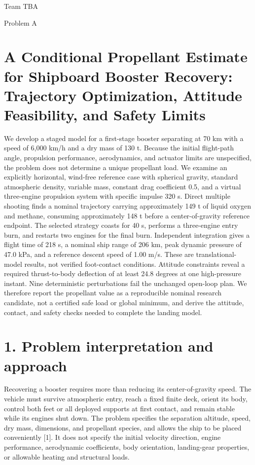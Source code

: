\documentclass[
  11pt,
  a4paper,
]{article}
\author{}
\date{}
\begin{document}
Team TBA

Problem A

\section*{A Conditional Propellant Estimate for Shipboard Booster
Recovery: Trajectory Optimization, Attitude Feasibility, and Safety
Limits}\label{a-conditional-propellant-estimate-for-shipboard-booster-recovery-trajectory-optimization-attitude-feasibility-and-safety-limits}

We develop a staged model for a first-stage booster separating at 70 km
with a speed of 6,000 km/h and a dry mass of 130 t. Because the initial
flight-path angle, propulsion performance, aerodynamics, and actuator
limits are unspecified, the problem does not determine a unique
propellant load. We examine an explicitly horizontal, wind-free
reference case with spherical gravity, standard atmospheric density,
variable mass, constant drag coefficient 0.5, and a virtual three-engine
propulsion system with specific impulse 320 s. Direct multiple shooting
finds a nominal trajectory carrying approximately 149 t of liquid oxygen
and methane, consuming approximately 148 t before a center-of-gravity
reference endpoint. The selected strategy coasts for 40 s, performs a
three-engine entry burn, and restarts two engines for the final burn.
Independent integration gives a flight time of 218 s, a nominal ship
range of 206 km, peak dynamic pressure of 47.0 kPa, and a reference
descent speed of 1.00 m/s. These are translational-model results, not
verified foot-contact conditions. Attitude constraints reveal a required
thrust-to-body deflection of at least 24.8 degrees at one high-pressure
instant. Nine deterministic perturbations fail the unchanged open-loop
plan. We therefore report the propellant value as a reproducible nominal
research candidate, not a certified safe load or global minimum, and
derive the attitude, contact, and safety checks needed to complete the
landing model.

\newpage

\section{1. Problem interpretation and
approach}\label{problem-interpretation-and-approach}

Recovering a booster requires more than reducing its center-of-gravity
speed. The vehicle must survive atmospheric entry, reach a fixed finite
deck, orient its body, control both feet or all deployed supports at
first contact, and remain stable while its engines shut down. The
problem specifies the separation altitude, speed, dry mass, dimensions,
and propellant species, and allows the ship to be placed conveniently
{[}1{]}. It does not specify the initial velocity direction, engine
performance, aerodynamic coefficients, body orientation, landing-gear
properties, or allowable heating and structural loads.
\end{document}
